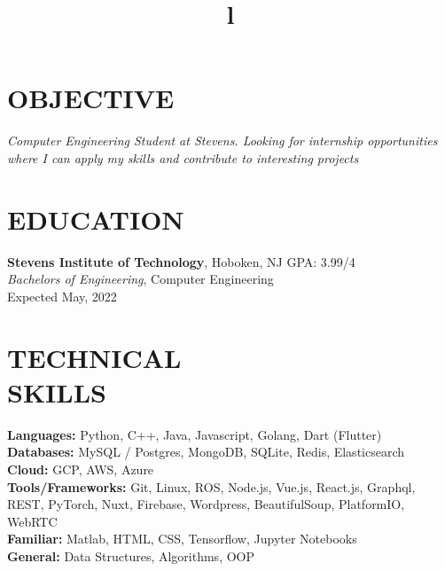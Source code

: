 \documentclass[margin]{res}
\begin{document}
\begin{resume}

\section{OBJECTIVE}
{\sl Computer Engineering Student at Stevens. Looking for internship opportunities 
  where I can apply my skills and contribute to interesting projects}

\section{EDUCATION}
\textbf{Stevens Institute of Technology}, Hoboken, NJ \hfill GPA: 3.99/4\\
{\sl Bachelors of Engineering}, Computer Engineering\\
Expected May, 2022

\section{TECHNICAL\\SKILLS}

\textbf{Languages: } Python, C++, Java, Javascript, Golang, Dart (Flutter)
\\
\textbf{Databases: } MySQL / Postgres, MongoDB, SQLite, Redis, Elasticsearch
\\
\textbf{Cloud: } GCP, AWS, Azure
\\
\textbf{Tools/Frameworks: } Git, Linux, ROS, Node.js, Vue.js, React.js, Graphql, REST,
PyTorch, Nuxt, Firebase, Wordpress, BeautifulSoup, PlatformIO, WebRTC
\\
\textbf{Familiar: } Matlab, HTML, CSS, Tensorflow, Jupyter Notebooks
\\
\textbf{General: } Data Structures, Algorithms, OOP

\begin{format}
\title{l}\\
\\
\body\\
\end{format}


\end{resume}
\end{document}
